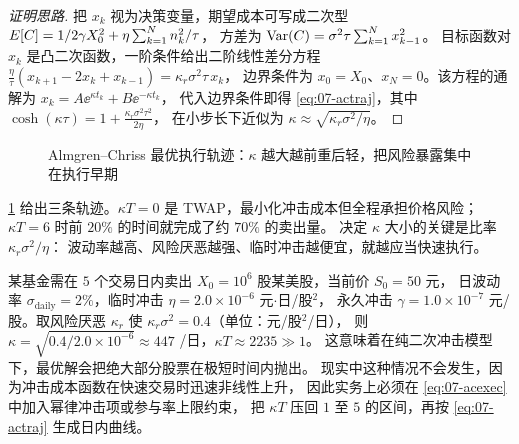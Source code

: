 \begin{proof}[证明思路]
把 $x_k$ 视为决策变量，期望成本可写成二次型
$E[C] = 1/2\gamma X_0^{2} + \eta\sum_{k=1}^{N}n_k^{2}/\tau$，
方差为 $\operatorname{Var}(C) = \sigma^{2}\tau \sum_{k=1}^{N} x_{k-1}^{2}$。
目标函数对 $x_k$ 是凸二次函数，一阶条件给出二阶线性差分方程
$\frac{\eta}{\tau}(x_{k+1} - 2x_k + x_{k-1}) = \kappa_r\sigma^{2}\tau\, x_k$，
边界条件为 $x_0 = X_0$、$x_N = 0$。该方程的通解为 $x_k = A\ee^{\kappa t_k} + B\ee^{-\kappa t_k}$，
代入边界条件即得 \cref{eq:07-actraj}，其中
$\cosh(\kappa\tau) = 1 + \frac{\kappa_r\sigma^{2}\tau^{2}}{2\eta}$，
在小步长下近似为 $\kappa \approx \sqrt{\kappa_r\sigma^{2}/\eta}$。
\end{proof}

\begin{figure}[htbp]
\centering
{}
\caption{Almgren--Chriss 最优执行轨迹：$\kappa$ 越大越前重后轻，把风险暴露集中在执行早期}\label{fig:07-ac}
\end{figure}

\cref{fig:07-ac} 给出三条轨迹。$\kappa T = 0$ 是 TWAP，最小化冲击成本但全程承担价格风险；
$\kappa T = 6$ 时前 $20\%$ 的时间就完成了约 $70\%$ 的卖出量。
决定 $\kappa$ 大小的关键是比率 $\kappa_r\sigma^{2}/\eta$：
波动率越高、风险厌恶越强、临时冲击越便宜，就越应当快速执行。

\begin{example}[五年期对冲基金的执行成本权衡]\label{ex:07-ac}
某基金需在 $5$ 个交易日内卖出 $X_0 = 10^{6}$ 股某美股，当前价 $S_0 = 50$ 元，
日波动率 $\sigma_{\text{daily}} = 2\%$，临时冲击 $\eta = 2.0\times 10^{-6}$ 元$\cdot$日/股$^2$，
永久冲击 $\gamma = 1.0\times 10^{-7}$ 元/股。取风险厌恶 $\kappa_r$ 使 $\kappa_r\sigma^{2} = 0.4$（单位：元/股$^2$/日），
则 $\kappa = \sqrt{0.4/2.0\times 10^{-6}} \approx 447$ /日，$\kappa T \approx 2235 \gg 1$。
这意味着在纯二次冲击模型下，最优解会把绝大部分股票在极短时间内抛出。
现实中这种情况不会发生，因为冲击成本函数在快速交易时迅速非线性上升，
因此实务上必须在 \cref{eq:07-acexec} 中加入幂律冲击项或参与率上限约束，
把 $\kappa T$ 压回 $1$ 至 $5$ 的区间，再按 \cref{eq:07-actraj} 生成日内曲线。
\end{example}

